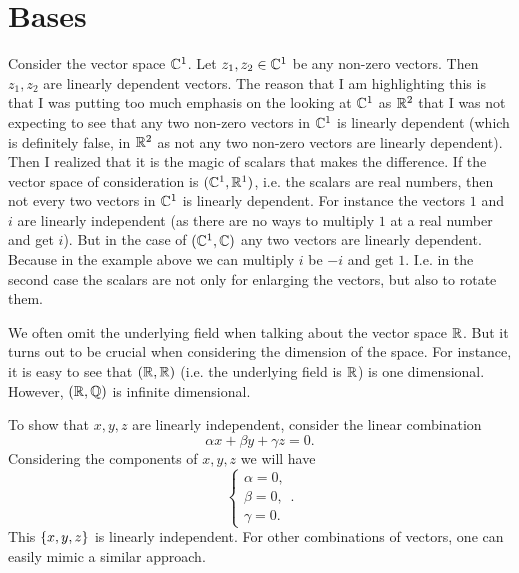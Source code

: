 \section{Bases}
\begin{observation}
	Consider the vector space $ \mathbb{C}^1 $. Let $ z_1,z_2 \in \mathbb{C}^1 $ be any non-zero vectors. Then $ z_1,z_2 $ are linearly dependent vectors. The reason that I am highlighting this is that I was putting too much emphasis on the looking at $ \mathbb{C}^1 $ as $ \mathbb{R}^2 $ that I was not expecting to see that any two non-zero vectors in $ \mathbb{C}^1 $ is linearly dependent (which is definitely false, in $ \mathbb{R}^2 $ as not any two non-zero vectors are linearly dependent). Then I realized that it is the magic of scalars that makes the difference. If the vector space of consideration is $ (\mathbb{C}^1,\mathbb{R}^1) $, i.e. the scalars are real numbers, then not every two vectors in $ \mathbb{C}^1 $ is linearly dependent. For instance the vectors $ 1 $ and $ i $ are linearly independent (as there are no ways to multiply $ 1 $ at a real number and get $ i $). But in the case of $ (\mathbb{C}^1, \mathbb{C}) $ any two vectors are linearly dependent. Because in the example above we can multiply $ i $ be $ -i $ and get $ 1 $. I.e. in the second case the scalars are not only for enlarging the vectors, but also to rotate them.
\end{observation}

\begin{observation}
	We often omit the underlying field when talking about the vector space $ \mathbb{R} $. But it turns out to be crucial when considering the dimension of the space. For instance, it is easy to see that $ (\mathbb{R},\mathbb{R}) $ (i.e. the underlying field is $ \mathbb{R} $) is one dimensional. However, $ (\mathbb{R},\mathbb{Q}) $ is infinite dimensional.
\end{observation}

\begin{problem}
	\begin{solution}
		To show that $ x,y,z $ are linearly independent, consider the linear combination
		\[ \alpha x + \beta y + \gamma z = 0. \]
		Considering the components of $ x,y,z $ we will have
		\[ \begin{cases}
			\alpha = 0,\\
			\beta = 0,\\
			\gamma = 0.
		\end{cases}. \]
		This $ \{x,y,z\} $ is linearly independent. For other combinations of vectors, one can easily mimic a similar approach.
	\end{solution} 
\end{problem}

